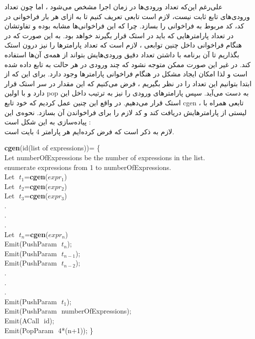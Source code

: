 

علی‌رغم این‌که
تعداد
ورودی‌ها در زمان
اجرا مشخص می‌شود ، اما چون 
تعداد ورودی‌های تابع ثابت نیست،
لازم است تابعی تعریف کنیم تا به ازای هر بار فراخوانی در کد،
کد مربوط به فراخوانی را بسازد.
چرا که این فراخوانی‌ها مشابه بوده و تفاوتشان در تعداد پارامترهایی که باید در استک قرار بگیرند خواهد بود.
به این صورت که در هنگام فراخوانی داخل چنین توابعی ، لازم است که تعداد پارامترها را نیز درون استک بگذاریم تا آن برنامه با داشتن تعداد دقیق ورودی‌هایش 
بتواند
از همه‌ی 
آن‌ها استفاده کند.
در غیر این صورت ممکن متوجه نشود که چند ورودی در هر حالت به تابع داده شده است و لذا امکان ایجاد مشکل در هنگام فراخوانی پارامترها وجود دارد.
برای این که از ابتدا بتوانیم این تعداد را در نظر بگیریم ، فرض می‌کنیم که این مقدار در سر استک قرار دارد و با اولین pop
به دست می‌آید.
سپس پارامترهای ورودی را نیز به ترتیب داخل این استک قرار می‌دهیم.
در واقع این چنین عمل کردیم که خود تابع 
cgen
،
تابعی همراه با لیستی از پارامترهایش دریافت کند و کد لازم را برای فراخواندن آن بسازد.
نحوه‌ی این پیاده‌سازی به این شکل است
:
\\
لازم به ذکر است که فرض کرده‌ایم هر پارامتر 4 بایت است.
\\
\begin{latin}
\textbf{cgen}(id(list of expressions))=
\big\{ 
\\Let numberOfExpressions be the number of expressions in the list.\\
enumerate expressions from 1 to numberOfExpressions.
\\
{Let} {$ $} $t_{1}$=\textbf{cgen}($expr_{1}$)
\\
Let {$ $} $t_{2}$=\textbf{cgen}($expr_{2}$)
\\
Let {$ $} $t_{3}$=\textbf{cgen}($expr_{3}$)
\\
.
\\
.
\\
.
\\
Let {$ $} $t_{n}$=\textbf{cgen}($expr_{n}$)
\\
Emit(PushParam {$ $} $t_{n}$);
\\
Emit(PushParam {$ $} $t_{n-1}$);
\\
Emit(PushParam {$ $} $t_{n-2}$);
\\
.
\\
.
\\
.
\\
Emit(PushParam {$ $} $t_{1}$);
\\
Emit(PushParam {$ $} numberOfExpressions);
\\
Emit(ACall {$ $} id);
\\
Emit(PopParam {$ $} 4*(n+1));
\big\}
\end{latin}
\newpage
